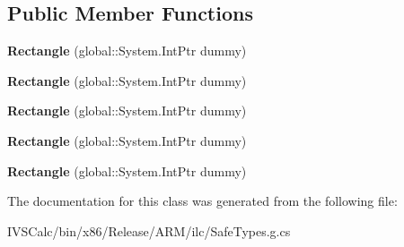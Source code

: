 \subsection*{Public Member Functions}
\begin{DoxyCompactItemize}
\item 
\mbox{\label{class_windows_1_1_u_i_1_1_xaml_1_1_shapes_1_1_rectangle_a6366fc279119b0b2953cabccf58db8de}} 
{\bfseries Rectangle} (global\+::\+System.\+Int\+Ptr dummy)
\item 
\mbox{\label{class_windows_1_1_u_i_1_1_xaml_1_1_shapes_1_1_rectangle_a6366fc279119b0b2953cabccf58db8de}} 
{\bfseries Rectangle} (global\+::\+System.\+Int\+Ptr dummy)
\item 
\mbox{\label{class_windows_1_1_u_i_1_1_xaml_1_1_shapes_1_1_rectangle_a6366fc279119b0b2953cabccf58db8de}} 
{\bfseries Rectangle} (global\+::\+System.\+Int\+Ptr dummy)
\item 
\mbox{\label{class_windows_1_1_u_i_1_1_xaml_1_1_shapes_1_1_rectangle_a6366fc279119b0b2953cabccf58db8de}} 
{\bfseries Rectangle} (global\+::\+System.\+Int\+Ptr dummy)
\item 
\mbox{\label{class_windows_1_1_u_i_1_1_xaml_1_1_shapes_1_1_rectangle_a6366fc279119b0b2953cabccf58db8de}} 
{\bfseries Rectangle} (global\+::\+System.\+Int\+Ptr dummy)
\end{DoxyCompactItemize}


The documentation for this class was generated from the following file\+:\begin{DoxyCompactItemize}
\item 
I\+V\+S\+Calc/bin/x86/\+Release/\+A\+R\+M/ilc/Safe\+Types.\+g.\+cs\end{DoxyCompactItemize}
